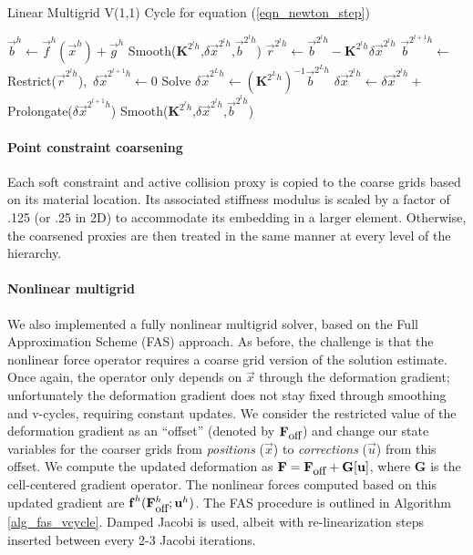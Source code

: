 \begin{algorithm}[h]
\caption{Linear Multigrid V(1,1) Cycle for equation (\ref{eqn_newton_step})}\label{alg_linear_vcycle}
\begin{algorithmic}[1]
\State $\vec{b}^h\gets \vec{f}^h(\vec{x}^h)+\vec{g}^h$
\State Smooth($\mathbf{K}^{2^lh}$,$\delta\vec{x}^{2^lh}$,$\vec{b}^{2^lh}$)
\State $\vec{r}^{2^lh}\gets\vec{b}^{2^lh}-\mathbf{K}^{2^lh}\delta\vec{x}^{2^lh}$
\State $\vec{b}^{2^{l+1}h}\gets$Restrict($\vec{r}^{2^lh}$),\ $\delta\vec{x}^{2^{l+1}h}\gets 0$
\EndFor
\State Solve $\delta\vec{x}^{2^Lh}\gets (\mathbf{K}^{2^Lh})^{-1}\vec{b}^{2^Lh}$
\State $\delta\vec{x}^{2^lh}\gets \delta\vec{x}^{2^lh}+$Prolongate($\delta\vec{x}^{2^{l+1}h}$)
\State Smooth($\mathbf{K}^{2^lh}$,$\delta\vec{x}^{2^lh}$,$\vec{b}^{2^lh}$)
\EndFor
\EndProcedure
\end{algorithmic}
\end{algorithm}

\paragraph{Point constraint coarsening} Each soft constraint and active collision proxy is copied to the coarse grids based on its material location.  Its associated stiffness modulus is scaled by a factor of .125 (or .25 in 2D) to accommodate its embedding in a larger element.  Otherwise, the coarsened proxies are then treated in the same manner at every level of the hierarchy.

\paragraph{Nonlinear multigrid} We also implemented a fully nonlinear multigrid
solver, based on the Full Approximation Scheme (FAS) approach. As before, the
challenge is  that the nonlinear force operator requires a coarse grid version of the solution estimate. Once
again, the operator only depends on $\vec{x}$ through the deformation gradient;
unfortunately the deformation gradient does not stay fixed through smoothing and
v-cycles, requiring constant updates.  We consider the restricted value of the
deformation gradient as an ``offset'' (denoted by $\mathbf{F}_{\mbox{\small off}}$) and change
our state variables for the coarser grids from \emph{positions} ($\vec{x}$) to
\emph{corrections} ($\vec{u}$) from this offset. We compute the updated deformation  as
$\mathbf{F}=\mathbf{F}_{\mbox{\small off}}+\mathbf{G}[\vec{u}]$, where
$\mathbf{G}$ is the cell-centered gradient operator. The nonlinear forces
computed based on this updated gradient are 
$\vec{f}^h(\mathbf{F}_{\mbox{\small off}}^h;\vec{u}^h)$. The FAS procedure is
outlined in Algorithm
\ref{alg_fas_vcycle}. Damped Jacobi is used, albeit with re-linearization steps inserted between every 2-3 Jacobi iterations.

